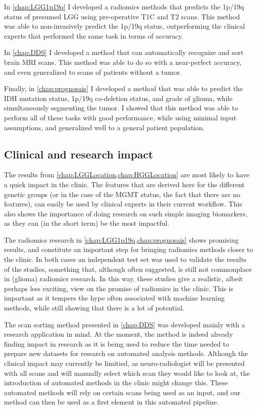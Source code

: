 In \cref{chap:LGG1p19q} I developed a radiomics methods that predicts the 1p/19q status of presumed \gls{LGG} using pre-operative \gls{T1C} and \gls{T2} scans.
This method was able to non-invasively predict the 1p/19q status, outperforming the clinical experts that performed the same task in terms of accuracy.

In \cref{chap:DDS} I developed a method that can automatically recognize and sort brain \gls{MRI} scans.
This method was able to do so with a near-perfect accuracy, and even generalized to scans of patients without a \gls{tumor}.

Finally, in \cref{chap:prognosais} I developed a method that was able to predict the \gls{IDH} mutation status, 1p/19q co-deletion status, and grade of glioma, while simultaneously segmenting the \gls{tumor}.
I showed that this method was able to perform all of these tasks with good performance, while using minimal input assumptions, and generalized well to a general patient population.


\subsection{Clinical and research impact}

The results from \cref{chap:LGGLocation,chap:HGGLocation} are most likely to have a quick impact in the clinic.
The features that are derived here for the different genetic groups (or in the case of the \gls{MGMT} status, the fact that there are no features), can easily be used by clinical experts in their current workflow.
This also shows the importance of doing research on such simple imaging biomarkers, as they can (in the short term) be the most impactful.

The radiomics research in \cref{chap:LGG1p19q,chap:prognosais} shows promising results, and constitute an important step for bringing radiomics methods closer to the clinic.
In both cases an independent test set was used to validate the results of the studies, something that, although often suggested, is still not commonplace in (glioma) radiomics research.
In this way, these studies give a realistic, albeit perhaps less exciting, view on the promise of radiomics in the clinic.
This is important as it tempers the hype often associated with machine learning methods, while still showing that there is a lot of potential.

The scan sorting method presented in \cref{chap:DDS} was developed mainly with a research application in mind.
At the moment, the method is indeed already finding impact in research as it is being used to reduce the time needed to prepare new datasets for research on automated analysis methods.
Although the clinical impact may currently be limitied, as neuro-radiologist will be presented with all scans and will manually select which scan they would like to look at, the introduction of automated methods in the clinic might change this.
These automated methods will rely on certain scans being used as an input, and our method can then be used as a first element in this automated pipeline.

